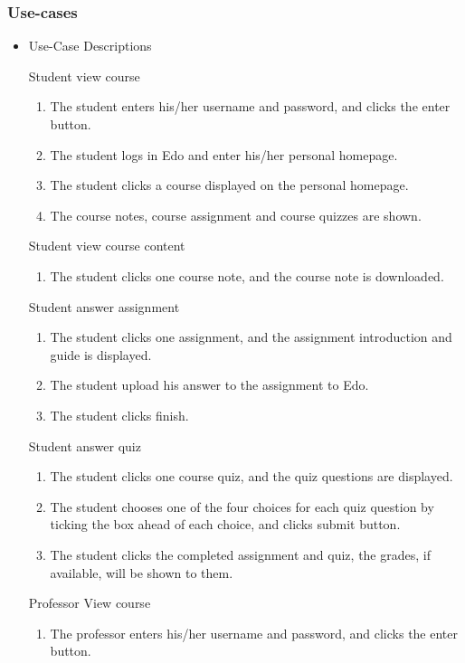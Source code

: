 \documentclass[paper=a4, fontsize=11pt]{scrartcl}
\numberwithin{equation}{section}		%
\numberwithin{figure}{section}			%
\numberwithin{table}{section}				%
\begin{document}
\subsubsection{Use-cases}
\begin{itemize}
	\item Use-Case Descriptions
	\par Student view course
	\begin{enumerate}
		\item The student enters his/her username and password, and clicks the enter button.
		\item The student logs in Edo and enter his/her personal homepage.
		\item The student clicks a course displayed on the personal homepage.
		\item The course notes, course assignment and course quizzes are shown.
	\end{enumerate}
	\par Student view course content
	\begin{enumerate}
		\item The student clicks one course note, and the course note is downloaded.
	\end{enumerate}
	\par Student answer assignment
	\begin{enumerate}
		\item The student clicks one assignment, and the assignment introduction and guide is displayed.
		\item The student upload his answer to the assignment to Edo.
		\item The student clicks finish.
	\end{enumerate}
	\par Student answer quiz
	\begin{enumerate}
		\item The student clicks one course quiz, and the quiz questions are displayed.
		\item The student chooses one of the four choices for each quiz question by ticking the box ahead of each choice, and clicks submit button.
		\item The student clicks the completed assignment and quiz, the grades, if available, will be shown to them. 
	\end{enumerate}
	\par Professor View course
	\begin{enumerate}
		\item The professor enters his/her username and password, and clicks the enter button.

\end{enumerate}
\end{itemize}
\end{document}
